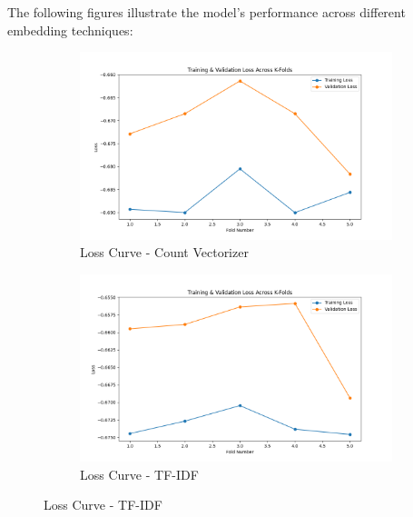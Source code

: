 The following figures illustrate the model’s performance across different embedding techniques:
\begin{figure}[H]
    \centering
    \begin{subfigure}[b]{0.44\textwidth}
        \includegraphics[width=\textwidth]{img/report_info/img/1.4.RF/best_random_forest_count_loss.png}
        \caption{Loss Curve - Count Vectorizer}
        \label{fig:rf-count-loss}
    \end{subfigure}
    \begin{subfigure}[b]{0.44\textwidth}
        \includegraphics[width=\textwidth]{img/report_info/img/1.4.RF/best_random_forest_tfidf_loss.png}
        \caption{Loss Curve - TF-IDF}
        \label{fig:rf-tfidf-loss}
    \end{subfigure}
    

\end{figure}
